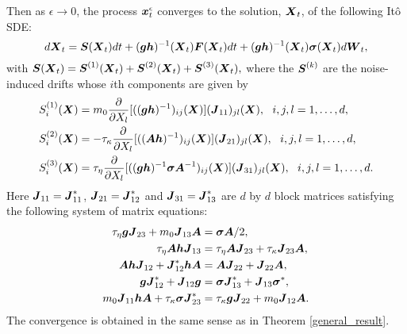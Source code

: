 \begin{corollary}
Then as $\epsilon \to 0$, the process $\boldsymbol{x}^\epsilon_{t}$ converges to the solution, $\boldsymbol{X}_{t}$, of the following It\^o SDE:
\begin{equation} \label{limitSDE}
d\boldsymbol{X}_{t} = \boldsymbol{S}(\boldsymbol{X}_{t}) dt + (\boldsymbol{g} \boldsymbol{h})^{-1}(\boldsymbol{X}_{t})\boldsymbol{F}(\boldsymbol{X}_{t}) dt + (\boldsymbol{g}\boldsymbol{h})^{-1}(\boldsymbol{X}_{t}) \boldsymbol{\sigma}(\boldsymbol{X}_{t}) d\boldsymbol{W}_{t},
\end{equation}
with $\boldsymbol{S}(\boldsymbol{X}_{t}) = \boldsymbol{S}^{(1)}(\boldsymbol{X}_{t}) + \boldsymbol{S}^{(2)}(\boldsymbol{X}_{t}) + \boldsymbol{S}^{(3)}(\boldsymbol{X}_{t}),$ where the $\boldsymbol{S}^{(k)}$ are the noise-induced drifts whose $i$th components are given by 
\begin{align}
S^{(1)}_{i}(\boldsymbol{X})  &= m_{0} \frac{\partial}{\partial X_{l}}[((\boldsymbol{g}\boldsymbol{h})^{-1})_{ij}(\boldsymbol{X})] (\boldsymbol{J}_{11})_{jl}(\boldsymbol{X}), \ \
i,j,l = 1, \dots, d, \label{nid1} \\ 
S^{(2)}_{i}(\boldsymbol{X})  &= -\tau_{\kappa} \frac{\partial}{\partial X_{l}}[((\boldsymbol{A} \boldsymbol{h})^{-1})_{ij}(\boldsymbol{X})] (\boldsymbol{J}_{21})_{jl}(\boldsymbol{X}), \ \ i,j,l = 1, \dots, d, \label{nid2} \\ 
S^{(3)}_{i}(\boldsymbol{X}) &= \tau_{\eta} \frac{\partial}{\partial X_{l}}[((\boldsymbol{g}\boldsymbol{h})^{-1} \boldsymbol{\sigma} \boldsymbol{A}^{-1} )_{ij}(\boldsymbol{X})] (\boldsymbol{J}_{31})_{jl}(\boldsymbol{X}), \ \ i,j,l = 1, \dots, d. \label{nid3}
\end{align}
Here
$\boldsymbol{J}_{11} = \boldsymbol{J}_{11}^*$, $\boldsymbol{J}_{21}=\boldsymbol{J}_{12}^*$ and $\boldsymbol{J}_{31} = \boldsymbol{J}_{13}^*$ are $d$ by $d$ block matrices satisfying the following system of matrix equations: 
\begin{align}
\tau_{\eta} \boldsymbol{g}  \boldsymbol{J}_{23} + m_0 \boldsymbol{J}_{13} \boldsymbol{A} &= \boldsymbol{\sigma}  \boldsymbol{A}/2, \label{subclass1_start} \\ 
\tau_{\eta} \boldsymbol{A}  \boldsymbol{h} \boldsymbol{J}_{13} &= \tau_{\eta} \boldsymbol{A} \boldsymbol{J}_{23} + \tau_{\kappa} \boldsymbol{J}_{23} \boldsymbol{A}, \\ 
\boldsymbol{A} \boldsymbol{h} \boldsymbol{J}_{12} + \boldsymbol{J}_{12}^* \boldsymbol{h} \boldsymbol{A} &= \boldsymbol{A} \boldsymbol{J}_{22} + \boldsymbol{J}_{22} \boldsymbol{A}, \\ 
\boldsymbol{g}  \boldsymbol{J}_{12}^* + \boldsymbol{J}_{12}  \boldsymbol{g} &= \boldsymbol{\sigma}\boldsymbol{J}_{13}^* + \boldsymbol{J}_{13}  \boldsymbol{\sigma}^*, \\ 
m_0 \boldsymbol{J}_{11} \boldsymbol{h} \boldsymbol{A} + \tau_{\kappa} \boldsymbol{\sigma} \boldsymbol{J}_{23}^* &= \tau_{\kappa} \boldsymbol{g}  \boldsymbol{J}_{22} + m_0 \boldsymbol{J}_{12} \boldsymbol{A}. \label{subclass1_end} 
\end{align}
The convergence is obtained in the same sense as in Theorem \ref{general_result}.
\end{corollary}
